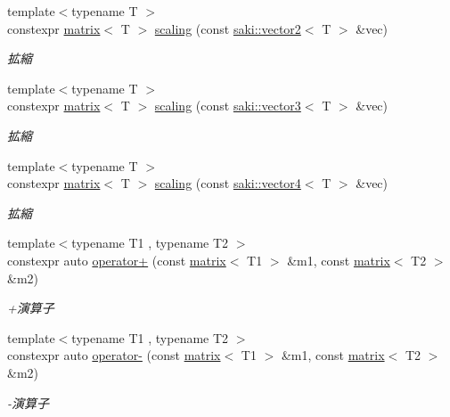 \begin{DoxyCompactItemize}
{\footnotesize template$<$typename T $>$ }\\constexpr \mbox{\hyperlink{classsaki_1_1matrix}{matrix}}$<$ T $>$ \mbox{\hyperlink{namespacesaki_abda5ab30bf4dc9240857d62d56e590f9}{scaling}} (const \mbox{\hyperlink{classsaki_1_1vector2}{saki\+::vector2}}$<$ T $>$ \&vec)
\begin{DoxyCompactList}\small\item\em 拡縮 \end{DoxyCompactList}\item 
{\footnotesize template$<$typename T $>$ }\\constexpr \mbox{\hyperlink{classsaki_1_1matrix}{matrix}}$<$ T $>$ \mbox{\hyperlink{namespacesaki_affcd920fe27abc17e5fa50f04bfabe05}{scaling}} (const \mbox{\hyperlink{classsaki_1_1vector3}{saki\+::vector3}}$<$ T $>$ \&vec)
\begin{DoxyCompactList}\small\item\em 拡縮 \end{DoxyCompactList}\item 
{\footnotesize template$<$typename T $>$ }\\constexpr \mbox{\hyperlink{classsaki_1_1matrix}{matrix}}$<$ T $>$ \mbox{\hyperlink{namespacesaki_aededd0f357c48d1e96af77b06cb3e786}{scaling}} (const \mbox{\hyperlink{classsaki_1_1vector4}{saki\+::vector4}}$<$ T $>$ \&vec)
\begin{DoxyCompactList}\small\item\em 拡縮 \end{DoxyCompactList}\item 
{\footnotesize template$<$typename T1 , typename T2 $>$ }\\constexpr auto \mbox{\hyperlink{namespacesaki_a10eb3090250dfcb43dd1c7579b6b473c}{operator+}} (const \mbox{\hyperlink{classsaki_1_1matrix}{matrix}}$<$ T1 $>$ \&m1, const \mbox{\hyperlink{classsaki_1_1matrix}{matrix}}$<$ T2 $>$ \&m2)
\begin{DoxyCompactList}\small\item\em +演算子 \end{DoxyCompactList}\item 
{\footnotesize template$<$typename T1 , typename T2 $>$ }\\constexpr auto \mbox{\hyperlink{namespacesaki_aa7474901f1f0d3a80142ed713b75ed5e}{operator-\/}} (const \mbox{\hyperlink{classsaki_1_1matrix}{matrix}}$<$ T1 $>$ \&m1, const \mbox{\hyperlink{classsaki_1_1matrix}{matrix}}$<$ T2 $>$ \&m2)
\begin{DoxyCompactList}\small\item\em -\/演算子 \end{DoxyCompactList}\item 

\end{DoxyCompactItemize}

